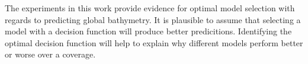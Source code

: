 The experiments in this work provide evidence for optimal model selection with regards to predicting global bathymetry.
It is plausible to assume that selecting a model with a decision function will produce better predicitions.
Identifying the optimal decision function will help to explain why different models perform better or worse over a coverage.
